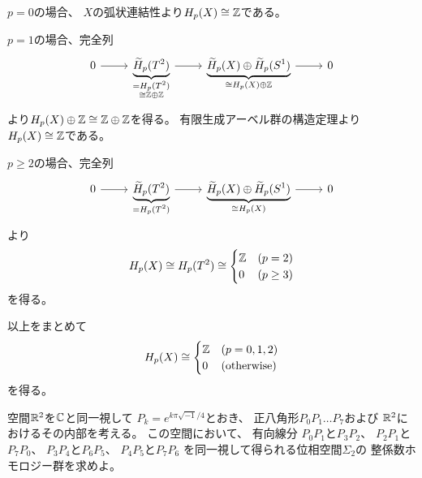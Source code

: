 \documentclass[report]{jlreq}
\begin{document}
\begin{answer}
    $p = 0$の場合、
    $X$の弧状連結性より$H_p(X) \cong \mathbb{Z}$である。

    $p = 1$の場合、完全列
    \begin{equation}
        \begin{tikzcd}
            0
                \ar{r}
                & \underbrace{\widetilde{H}_p(T^2)}_{\substack{
                    = H_p(T^2) \\
                    \cong \Z \oplus \Z
                }}
                    \ar{r}
                & \underbrace{\widetilde{H}_p(X) \oplus \widetilde{H}_p(S^1)}_{\substack{
                    \cong H_p(X) \oplus \Z
                }}
                    \ar{r}
                & 0
        \end{tikzcd}
    \end{equation}
    より$H_p(X) \oplus \mathbb{Z} \cong \mathbb{Z} \oplus \mathbb{Z}$を得る。
    有限生成アーベル群の構造定理より$H_p(X) \cong \mathbb{Z}$である。

    $p \ge 2$の場合、完全列
    \begin{equation}
        \begin{tikzcd}
            0
                \ar{r}
                & \underbrace{\widetilde{H}_p(T^2)}_{\substack{
                    = H_p(T^2)
                }}
                    \ar{r}
                & \underbrace{\widetilde{H}_p(X) \oplus \widetilde{H}_p(S^1)}_{\substack{
                    \cong H_p(X)
                }}
                    \ar{r}
                & 0
        \end{tikzcd}
    \end{equation}
    より
    \begin{equation}
        H_p(X) \cong H_p(T^2) \cong \begin{cases}
            \mathbb{Z} & (p = 2) \\
            0 & (p \ge 3)
        \end{cases}
    \end{equation}
    を得る。

    以上をまとめて
    \begin{equation}
        H_p(X) \cong \begin{cases}
            \mathbb{Z} & (p = 0, 1, 2) \\
            0 & (\text{otherwise})
        \end{cases}
    \end{equation}
    を得る。
\end{answer}

\begin{problem}
    空間$\mathbb{R}^2$を$\mathbb{C}$と同一視して
    $P_k = e^{k \pi \sqrt{-1} / 4}$とおき、
    正八角形$P_0 P_1 \dots P_7$および
    $\mathbb{R}^2$におけるその内部を考える。
    この空間において、
    有向線分
    $P_0 P_1$と$P_3 P_2$、
    $P_2 P_1$と$P_7 P_0$、
    $P_3 P_4$と$P_6 P_5$、
    $P_4 P_5$と$P_7 P_6$
    を同一視して得られる位相空間$\Sigma_2$の
    整係数ホモロジー群を求めよ。
\end{problem}
\end{document}
